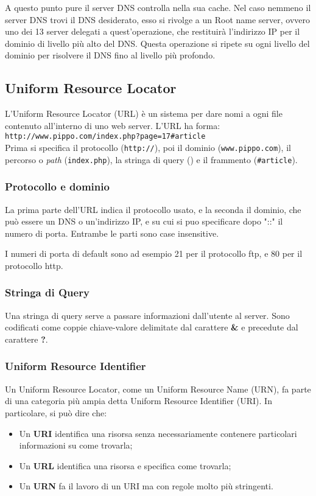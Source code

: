 \documentclass[a4paper,11pt]{article}
\begin{document}
A questo punto pure il server DNS controlla nella sua cache.
Nel caso nemmeno il server DNS trovi il DNS desiderato, esso si rivolge a un Root name server, ovvero uno dei 13 server delegati a quest'operazione, che restituirà l'indirizzo IP per il dominio di livello più alto del DNS.
Questa operazione si ripete su ogni livello del dominio per risolvere il DNS fino al livello più profondo.

\subsection{Uniform Resource Locator}
L'Uniform Resource Locator (URL) è un sistema per dare nomi a ogni file contenuto all'interno di uno web server.
L'URL ha forma: \\ \texttt{http://www.pippo.com/index.php?page=17\#article} \\
Prima si specifica il protocollo (\texttt{http://}), poi il dominio (\texttt{www.pippo.com}), il percorso o \textit{path} (\texttt{index.php}), la stringa di query () e il frammento (\texttt{\#article}).

\subsubsection{Protocollo e dominio}
La prima parte dell'URL indica il protocollo usato, e la seconda il dominio, che può essere un DNS o un'indirizzo IP, e su cui si puo specificare dopo "::" il numero di porta.
Entrambe le parti sono case insensitive.

I numeri di porta di default sono ad esempio 21 per il protocollo ftp, e 80 per il protocollo http.

\subsubsection{Stringa di Query}
Una stringa di query serve a passare informazioni dall'utente al server.
Sono codificati come coppie chiave-valore delimitate dal carattere \textbf{\&} e precedute dal carattere \textbf{?}.

\subsubsection{Uniform Resource Identifier}
Un Uniform Resource Locator, come un Uniform Resource Name (URN), fa parte di una categoria più ampia detta Uniform Resource Identifier (URI).
In particolare, si può dire che:
\begin{itemize}
	\item Un \textbf{URI} identifica una risorsa senza necessariamente contenere particolari informazioni su come trovarla;
	\item Un \textbf{URL} identifica una risorsa e specifica come trovarla;
	\item Un \textbf{URN} fa il lavoro di un URI ma con regole molto più stringenti.
\end{itemize}
\end{document}
